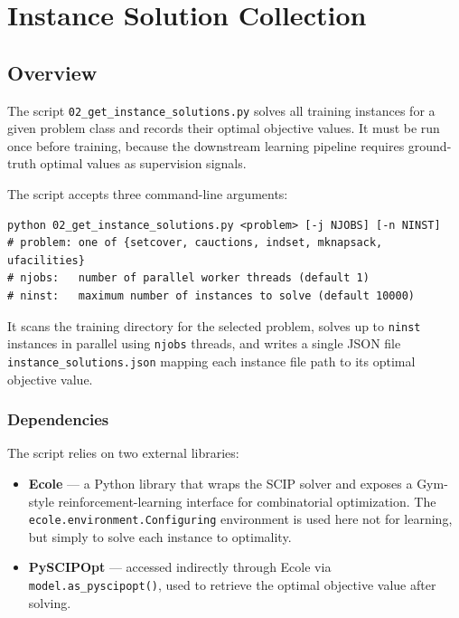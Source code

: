 \section{Instance Solution Collection}

\subsection{Overview}

The script \texttt{02\_get\_instance\_solutions.py} solves all training instances for a given problem class and records their optimal objective values. It must be run once before training, because the downstream learning pipeline requires ground-truth optimal values as supervision signals.

The script accepts three command-line arguments:

\begin{lstlisting}
python 02_get_instance_solutions.py <problem> [-j NJOBS] [-n NINST]
# problem: one of {setcover, cauctions, indset, mknapsack, ufacilities}
# njobs:   number of parallel worker threads (default 1)
# ninst:   maximum number of instances to solve (default 10000)
\end{lstlisting}

It scans the training directory for the selected problem, solves up to \texttt{ninst} instances in parallel using \texttt{njobs} threads, and writes a single JSON file \texttt{instance\_solutions.json} mapping each instance file path to its optimal objective value.

\subsubsection{Dependencies}

The script relies on two external libraries:
\begin{itemize}
    \item \textbf{Ecole} --- a Python library that wraps the SCIP solver and exposes a Gym-style reinforcement-learning interface for combinatorial optimization. The \texttt{ecole.environment.Configuring} environment is used here not for learning, but simply to solve each instance to optimality.
    \item \textbf{PySCIPOpt} --- accessed indirectly through Ecole via \texttt{model.as\_pyscipopt()}, used to retrieve the optimal objective value after solving.
\end{itemize}

